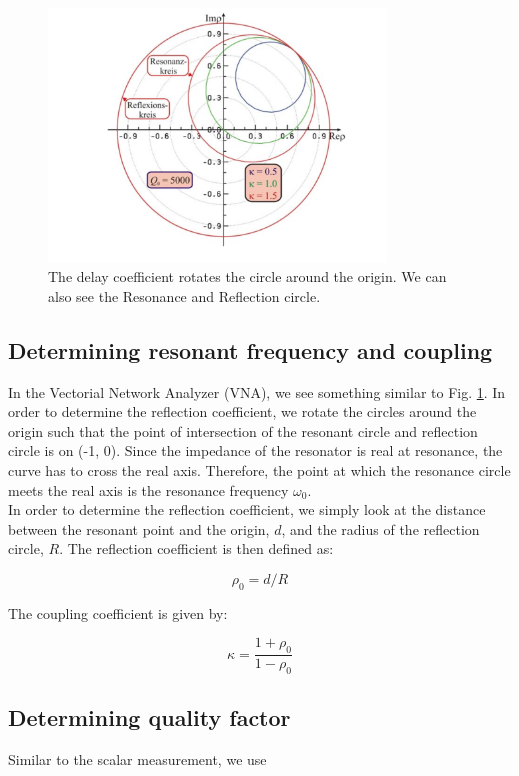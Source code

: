 \documentclass[a4paper]{article}
\numberwithin{equation}{section}
\begin{document}
\begin{figure}[hbt!]
    \centering
    \includegraphics[width=0.8\textwidth]{delay}
	\caption{The delay coefficient rotates the circle around the origin. We can also see the Resonance and Reflection circle. \cite{Switka22}}
    \label{fig:delay}
\end{figure}

\subsection{Determining resonant frequency and coupling}
In the Vectorial Network Analyzer (VNA), we see something similar to Fig. \ref{fig:delay}. In order to determine the reflection coefficient, we rotate the circles around the origin such that the point of intersection of the resonant circle and reflection circle is on (-1, 0). Since the impedance of the resonator is real at resonance, the curve has to cross the real axis. Therefore, the point at which the resonance circle meets the real axis is the resonance frequency $\omega_{0}$. \\
In order to determine the reflection coefficient, we simply look at the distance between the resonant point and the origin, $d$, and the radius of the reflection circle, $R$. The reflection coefficient is then defined as: 

\[
		\rho_{0} = d/ R
\]

The coupling coefficient is given by: 

\[
		\kappa = \frac{1 + \rho_{0}}{1 - \rho_{0}}
\]


\subsection{Determining quality factor}
Similar to the scalar measurement, we use
\end{document}
